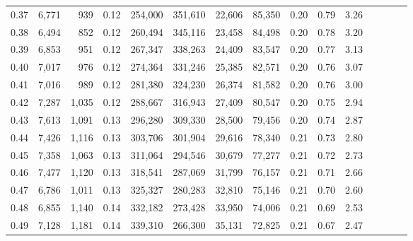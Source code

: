 \begin{tabular}{rrrcrrrrrrrrrrr}
0.37 &   6,771 &     939 &                                       0.12 &  254,000 &  351,610 &   22,606 &   85,350 &  0.20 &  0.79 &                         3.26 \\
0.38 &   6,494 &     852 &                                       0.12 &  260,494 &  345,116 &   23,458 &   84,498 &  0.20 &  0.78 &                         3.20 \\
0.39 &   6,853 &     951 &                                       0.12 &  267,347 &  338,263 &   24,409 &   83,547 &  0.20 &  0.77 &                         3.13 \\
0.40 &   7,017 &     976 &                                       0.12 &  274,364 &  331,246 &   25,385 &   82,571 &  0.20 &  0.76 &                         3.07 \\
0.41 &   7,016 &     989 &                                       0.12 &  281,380 &  324,230 &   26,374 &   81,582 &  0.20 &  0.76 &                         3.00 \\
0.42 &   7,287 &   1,035 &                                       0.12 &  288,667 &  316,943 &   27,409 &   80,547 &  0.20 &  0.75 &                         2.94 \\
0.43 &   7,613 &   1,091 &                                       0.13 &  296,280 &  309,330 &   28,500 &   79,456 &  0.20 &  0.74 &                         2.87 \\
0.44 &   7,426 &   1,116 &                                       0.13 &  303,706 &  301,904 &   29,616 &   78,340 &  0.21 &  0.73 &                         2.80 \\
0.45 &   7,358 &   1,063 &                                       0.13 &  311,064 &  294,546 &   30,679 &   77,277 &  0.21 &  0.72 &                         2.73 \\
0.46 &   7,477 &   1,120 &                                       0.13 &  318,541 &  287,069 &   31,799 &   76,157 &  0.21 &  0.71 &                         2.66 \\
0.47 &   6,786 &   1,011 &                                       0.13 &  325,327 &  280,283 &   32,810 &   75,146 &  0.21 &  0.70 &                         2.60 \\
0.48 &   6,855 &   1,140 &                                       0.14 &  332,182 &  273,428 &   33,950 &   74,006 &  0.21 &  0.69 &                         2.53 \\
0.49 &   7,128 &   1,181 &                                       0.14 &  339,310 &  266,300 &   35,131 &   72,825 &  0.21 &  0.67 &                         2.47 \\

\end{tabular}
